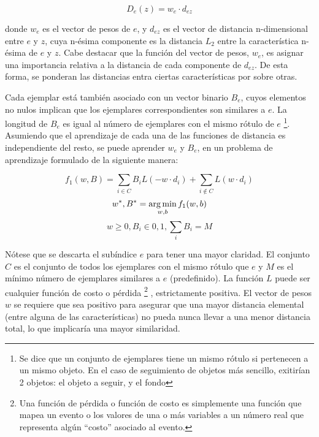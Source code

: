 \begin{equation}
    \label{eq:distance-exemplar}
    D_{e}(z) = w_{e} \cdot d_{ez}
\end{equation}

donde $w_{e}$ es el vector de pesos de $e$, y $d_{ez}$ es el vector de
distancia n-dimensional entre $e$ y $z$, cuya n-ésima componente es la
distancia $L_{2}$ entre la característica n-ésima de $e$ y $z$. Cabe destacar
que la función del vector de pesos, $w_{e}$, es asignar una importancia relativa a
la distancia de cada componente de $d_{ez}$. De esta forma, se ponderan las distancias
entra ciertas características por sobre otras.

Cada ejemplar está también asociado con un vector binario $B_{e}$, cuyos elementos
no nulos implican que los ejemplares correspondientes son similares a $e$. La
longitud de $B_{e}$ es igual al número de ejemplares con el mismo rótulo de $e$
\footnote{Se dice que un conjunto de ejemplares tiene un mismo rótulo si pertenecen a un mismo objeto. En el caso de seguimiento de objetos
más sencillo, exitirían 2 objetos: el objeto a seguir, y el fondo}.
Asumiendo que el aprendizaje de cada una de las funciones de distancia es
independiente del resto, se puede aprender $w_{e}$ y $B_{e}$, en un problema
de aprendizaje formulado de la siguiente manera:

\begin{equation}
    \label{eq:learning-problem}
    f_{1}(w,B) = \sum_{i \in C} B_{i}L(-w \cdot d_{i}) + \sum_{i\notin C}L(w \cdot d_{i})
\end{equation}
\begin{equation}
    {w^{*}, B^{*} = \operatorname*{arg\,min}_{w,b} f_{1} (w,b) }
\end{equation}
\begin{equation}
   w \geq 0, B_{i} \in {0,1}, \sum_{i} B_{i} = M
\end{equation}

Nótese que se descarta el subíndice $e$ para tener una mayor claridad. El
conjunto $C$ es el conjunto de todos los ejemplares con el mismo rótulo que $e$
y $M$ es el mínimo número de ejemplares similares a $e$ (predefinido). La
función $L$ puede ser cualquier función de costo o pérdida \footnote{Una
función de pérdida o función de costo es simplemente una función que mapea un
evento o los valores de una o más variables a un número real que representa
algún ``costo'' asociado al evento.} , estrictamente positiva. El vector de
pesos $w$ se requiere que sea positivo para asegurar que una mayor distancia
elemental (entre alguna de las características) no pueda nunca llevar a una
menor distancia total, lo que implicaría una mayor similaridad.

